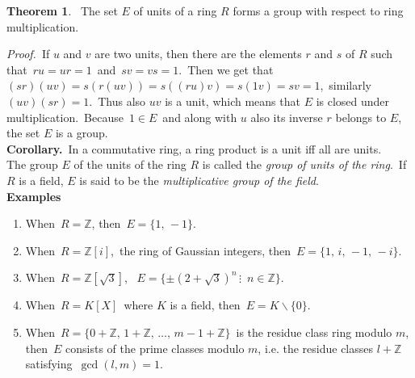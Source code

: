 \documentclass[12pt]{article}
\theoremstyle{definition}
\newtheorem*{thmplain}{Theorem}
\begin{document}
\begin{thmplain}
 \, The set $E$ of units of a ring $R$ forms a group with respect to ring multiplication. 
\end{thmplain}

{\em Proof.}\, If $u$ and $v$ are two units, then there are the elements $r$ and $s$ of $R$ such that\, $ru = ur = 1$\, and\, $sv = vs = 1$.\, Then we get that\,$(sr)(uv) = s(r(uv)) = s((ru)v) = s(1v) = sv = 1$,\, similarly\, $(uv)(sr) = 1$.\, Thus also $uv$ is a unit, which means that $E$ is closed under multiplication.\, Because\, $1 \in E$\, and along with $u$ also its inverse $r$ belongs to $E$, the set $E$ is a group.\\

\textbf{Corollary.}\, In a commutative ring, a ring product is a unit iff all  are units.\\

The group $E$ of the units of the ring $R$ is called the {\it group of units of the ring}.\, If $R$ is a field, $E$ is said to be the {\it multiplicative group of the field}.\\


\textbf{Examples}
\begin{enumerate}
 \item When\, $R = \mathbb{Z}$, then\, $E = \{1,\,-1\}$.
 \item When\, $R = \mathbb{Z}[i]$,\, the ring of Gaussian integers, then\, 
$E = \{1,\,i,\,-1,\,-i\}$.
 \item When\, $R = \mathbb{Z}[\sqrt{3}]$, \, 
$E = \{\pm(2\!+\!\sqrt{3})^n\,\vdots\,\,\, n\in\mathbb{Z}\}$.
 \item When\, $R = K[X]$\, where $K$ is a field, then\, $E = K\!\smallsetminus\!\{0\}$.
 \item When\, 
$R = \{0\!+\!\mathbb{Z},\,1\!+\!\mathbb{Z},\,\ldots,\, 
 m\!-\!1\!+\!\mathbb{Z}\}$\, is the residue class ring modulo $m$, then\, $E$ consists of the prime classes modulo $m$, i.e. the residue classes $l\!+\!\mathbb{Z}$ satisfying\, $\gcd(l, m) = 1$.
\end{enumerate}

\end{document}
